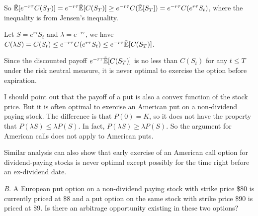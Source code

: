 \begin{solution}
So $\tilde{\mathbb{E}}[e^{-r\tau}C(S_T)]=e^{-r\tau}\tilde{\mathbb{E}}[C(S_T)]\geq e^{-r\tau}C(\tilde{\mathbb{E}}[S_T])
=e^{-r\tau}C(e^{r\tau}S_t)$, where the inequality is from Jensen's inequality.

Let $S=e^{r\tau}S_t$ and $\lambda=e^{-r\tau}$, we have
$C(\lambda S)=C(S_t)\leq e^{-r\tau}C(e^{r\tau}S_t)\leq e^{-r\tau}\tilde{\mathbb{E}}[C(S_T)]$.

Since the discounted payoff $e^{-r\tau}\tilde{\mathbb{E}}[C(S_T)]$ is no less than $C(S_t)$ for any
$t\leq T$ under the risk neutral measure, it is never optimal to exercise the option before
expiration.

I should point out that the payoff of a put is also a convex function of the stock price.
But it is often optimal to exercise an American put on a non-dividend paying stock. The
difference is that $P(0)=K$, so it does not have the property that $P(\lambda S)\leq\lambda P(S)$.
In fact, $P(\lambda S)\geq\lambda P(S)$. So the argument for American calls does not apply
to American puts.

Similar analysis can also show that early exercise of an American call option for
dividend-paying stocks is never optimal except possibly for the time right before an
ex-dividend date.

\end{solution}

\begin{problem}{\emph{B.} A European put option on a non-dividend paying stock with strike price \$80 is
currently priced at \$8 and a put option on the same stock with strike price \$90 is priced
at \$9. Is there an arbitrage opportunity existing in these two options?}
\end{problem}
